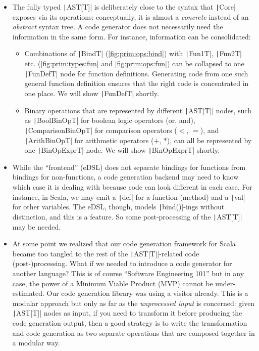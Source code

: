 \documentclass[11pt]{article}
\newcommand{\ScalaI}[1]{\texttt|#1|}
\begin{document}
\begin{itemize}
  \item The fully typed \ScalaI{AST[T]} is deliberately close to the syntax 
  that \ScalaI{Core} exposes via its operations: conceptually, it is almost a 
  \textit{concrete} instead of an \textit{abstract} syntax tree. A code 
  generator does not necessarily need the information in the same form. For 
  instance, information can be consolidated:

  \begin{itemize}
      \item Combinations of \ScalaI{BindT} (\autoref{fig:prim:ops:bind}) with 
      \ScalaI{Fun1T}, \ScalaI{Fun2T} etc. (\autoref{fig:prim:types:fun} and 
      \autoref{fig:prim:ops:fun}) can be collapsed to one \ScalaI{FunDefT} 
      node for function definitions. Generating code from one such general 
      function definition ensures that the right code is concentrated in one 
      place. We will show \ScalaI{FunDefT} shortly.
      
      \item Binary operations that are represented by different 
      \ScalaI{AST[T]} nodes, such as \ScalaI{BoolBinOpT} for boolean logic 
      operators (\textsf{or}, \textsf{and}), \ScalaI{ComparisonBinOpT} for 
      comparison operators ($<$, $=$), and \ScalaI{ArithBinOpT} for 
      arithmetic operators ($+$, $*$), can all be represented by one 
      \ScalaI{BinOpExprT} node. We will show \ScalaI{BinOpExprT} shortly.
  \end{itemize}
  
  \item While the ``frontend'' (eDSL) does not separate bindings for 
  functions from bindings for non-functions, a code generation backend may 
  need to know which case it is dealing with because code can look different 
  in each case. For instance, in Scala, we may emit a \ScalaI{def} for a 
  function (method) and a \ScalaI{val} for other variables. The eDSL, though, 
  models \ScalaI{bind()}-ings without distinction, and this is a feature. So 
  some post-processing of the \ScalaI{AST[T]} may be needed.

  \item At some point we realized that our code generation framework for 
  Scala became too tangled to the rest of the \ScalaI{AST[T]}-related code 
  (post-)processing. What if we needed to introduce a code generator for 
  another language? This is of course ``Software Engineering 101'' but in any 
  case, the power of a Minimum Viable Product (MVP) cannot be 
  under-estimated. Our code generation library was using a visitor already. 
  This is a modular approach but only as far as the \textit{unprocessed 
  input} is concerned: given \ScalaI{AST[T]} nodes as input, if you need to 
  transform it before producing the code generation output, then a good 
  strategy is to write the transformation and code generation as two separate 
  operations that are composed together in a modular way.
  

\end{itemize}
\end{document}
